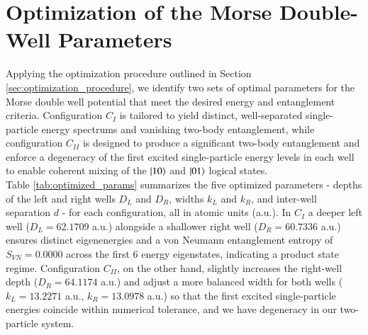 \documentclass{subfiles}
\begin{document}
\section{Optimization of the Morse Double-Well Parameters}\label{sec:optimization_result}
Applying the optimization procedure outlined in Section \ref{sec:optimization_procedure}, we identify two sets of optimal parameters for the Morse double well potential that meet the desired energy and entanglement criteria. Configuration $C_I$ is tailored to yield distinct, well-separated single-particle energy spectrums and vanishing two-body entanglement, while configuration $C_{II}$ is designed to produce a significant two-body entanglement and enforce a degeneracy of the first excited single-particle energy levels in each well to enable coherent mixing of the $\ket{10}$ and $\ket{01}$ logical states.
\\ 

Table \ref{tab:optimized_params} summarizes the five optimized parameters - depths of the left and right wells $D_L$ and $D_R$, widths $k_L$ and $k_R$, and inter-well separation $d$ -  for each configuration, all in atomic units (a.u.). In $C_I$ a deeper left well ($D_L = 62.1709$ a.u.) alongside a shallower right well ($D_R = 60.7336$ a.u.) ensures distinct eigenenergies and a von Neumann entanglement entropy of $S_{VN} = 0.0000$ across the first 6 energy eigenstates, indicating a product state regime. Configuration $C_{II}$, on the other hand, slightly increases the right-well depth ($D_R = 64.1174$ a.u.) and adjust a more balanced width for both wells ($k_L = 13.2271$ a.u., $k_R = 13.0978$ a.u.) so that the first excited single-particle energies coincide within numerical tolerance, and we have degeneracy in our two-particle system.
\end{document}
